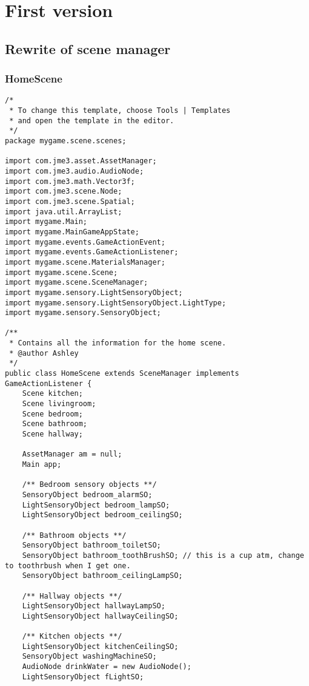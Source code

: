 \chapter{First version}

\section{Rewrite of scene manager}

\subsection{HomeScene}
\begin{lstlisting}
/*
 * To change this template, choose Tools | Templates
 * and open the template in the editor.
 */
package mygame.scene.scenes;

import com.jme3.asset.AssetManager;
import com.jme3.audio.AudioNode;
import com.jme3.math.Vector3f;
import com.jme3.scene.Node;
import com.jme3.scene.Spatial;
import java.util.ArrayList;
import mygame.Main;
import mygame.MainGameAppState;
import mygame.events.GameActionEvent;
import mygame.events.GameActionListener;
import mygame.scene.MaterialsManager;
import mygame.scene.Scene;
import mygame.scene.SceneManager;
import mygame.sensory.LightSensoryObject;
import mygame.sensory.LightSensoryObject.LightType;
import mygame.sensory.SensoryObject;

/**
 * Contains all the information for the home scene.
 * @author Ashley
 */
public class HomeScene extends SceneManager implements GameActionListener {
    Scene kitchen;
    Scene livingroom;
    Scene bedroom;
    Scene bathroom;
    Scene hallway;
    
    AssetManager am = null;
    Main app;
    
    /** Bedroom sensory objects **/
    SensoryObject bedroom_alarmSO;
    LightSensoryObject bedroom_lampSO;
    LightSensoryObject bedroom_ceilingSO;
    
    /** Bathroom objects **/
    SensoryObject bathroom_toiletSO;
    SensoryObject bathroom_toothBrushSO; // this is a cup atm, change to toothrbush when I get one.
    SensoryObject bathroom_ceilingLampSO;
    
    /** Hallway objects **/
    LightSensoryObject hallwayLampSO;
    LightSensoryObject hallwayCeilingSO;
    
    /** Kitchen objects **/
    LightSensoryObject kitchenCeilingSO;
    SensoryObject washingMachineSO;
    AudioNode drinkWater = new AudioNode();
    LightSensoryObject fLightSO;
    

\end{lstlisting}
